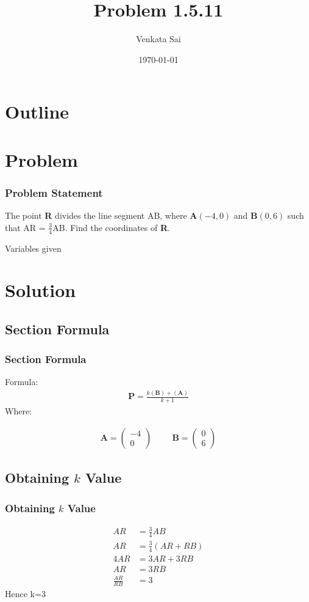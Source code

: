 \documentclass{beamer}
\title{Problem 1.5.11}
\author{Venkata Sai}
\date{\today}
\providecommand{\brak}[1]{\ensuremath{\left(#1\right)}}
\theoremstyle{remark}
\newcommand{\myvec}[1]{\ensuremath{\begin{pmatrix}#1\end{pmatrix}}}
\let\vec\mathbf
\numberwithin{equation}{section}
\begin{document}
\begin{frame}
\titlepage
\end{frame}

\section*{Outline}
\begin{frame}
\tableofcontents
\end{frame}
\section{Problem}
\begin{frame}
\frametitle{Problem Statement}
%
 The point \textbf{R} divides the line segment AB, where \textbf{A}$\brak{-4,0}$ and \textbf{B}$\brak{0,6}$ such that
AR = $\frac{3}{4}$AB. Find the coordinates of \textbf{R}. 
 \begin{table}[h!]    
  \centering
  
  \caption{Variables given}
  \label{tab 1.4.9.2}
\end{table}
\end{frame}

\section{Solution}
\subsection{Section Formula}
\begin{frame}
\frametitle{Section Formula}
Formula:
\begin{align}
\vec{P}=\frac{k(\vec{B})+(\vec{A})}{k+1}
\end{align}
Where: 


\begin{align}
\vec{A}=\myvec{-4\\0} \hspace{1cm} \vec{B}=\myvec{0\\6} 
\end{align}


\end{frame}
\subsection{Obtaining $k$ Value}
\begin{frame}
\frametitle{Obtaining $k$ Value}
\begin{align}
	AR&=\frac{3}{4}AB \\
    AR&=\frac{3}{4}(AR+RB) \\
    4AR&=3AR+3RB \\
    AR&=3RB\\
\frac{AR}{RB}&=3
\end{align}
Hence k=3
\end{frame}
\end{document}
